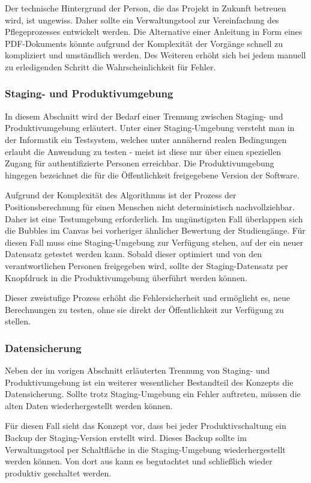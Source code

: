 Der technische Hintergrund der Person, die das Projekt in Zukunft betreuen wird, ist ungewiss. Daher sollte ein Verwaltungstool zur Vereinfachung des Pflegeprozesses entwickelt werden. Die Alternative einer Anleitung in Form eines PDF-Dokuments könnte aufgrund der Komplexität der Vorgänge schnell zu kompliziert und umständlich werden. Des Weiteren erhöht sich bei jedem manuell zu erledigenden Schritt die Wahrscheinlichkeit für Fehler.

\subsubsection{Staging- und Produktivumgebung}
In diesem Abschnitt wird der Bedarf einer Trennung zwischen Staging- und Produktivumgebung erläutert. Unter einer Staging-Umgebung versteht man in der Informatik ein Testsystem, welches unter annähernd realen Bedingungen erlaubt die Anwendung zu testen - meist ist diese nur über einen speziellen Zugang für authentifizierte Personen erreichbar. Die Produktivumgebung hingegen bezeichnet die für die Öffentlichkeit freigegebene Version der Software.

Aufgrund der Komplexität des Algorithmus ist der Prozess der Positionsberechnung für einen Menschen nicht deterministisch nachvollziehbar. Daher ist eine Testumgebung erforderlich. Im ungünstigsten Fall überlappen sich die Bubbles im Canvas bei vorheriger ähnlicher Bewertung der Studiengänge. Für diesen Fall muss eine Staging-Umgebung zur Verfügung stehen, auf der ein neuer Datensatz getestet werden kann. Sobald dieser optimiert und von den verantwortlichen Personen freigegeben wird, sollte der Staging-Datensatz per Knopfdruck in die Produktivumgebung überführt werden können.

Dieser zweistufige Prozess erhöht die Fehlersicherheit und ermöglicht es, neue Berechnungen zu testen, ohne sie direkt der Öffentlichkeit zur Verfügung zu stellen.

\subsubsection{Datensicherung}
Neben der im vorigen Abschnitt erläuterten Trennung von Staging- und Produktivumgebung ist ein weiterer wesentlicher Bestandteil des Konzepts die Datensicherung. Sollte trotz Staging-Umgebung ein Fehler auftreten, müssen die alten Daten wiederhergestellt werden können.

Für diesen Fall sieht das Konzept vor, dass bei jeder Produktivschaltung ein Backup der Staging-Version erstellt wird. Dieses Backup sollte im Verwaltungstool per Schaltfläche in die Staging-Umgebung wiederhergestellt werden können. Von dort aus kann es begutachtet und schließlich wieder produktiv geschaltet werden.

